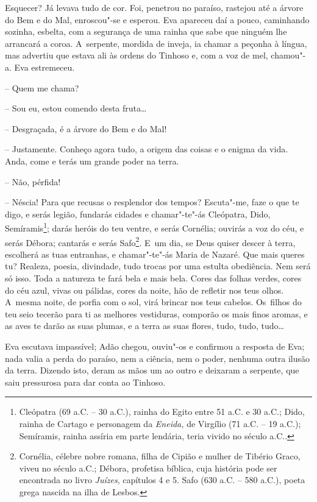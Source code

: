 Esquecer? Já levava tudo de cor. Foi, penetrou no paraíso, rastejou até
a árvore do Bem e do Mal, enroscou"-se e esperou. Eva apareceu daí a
pouco, caminhando sozinha, esbelta, com a segurança de uma rainha que
sabe que ninguém lhe arrancará a coroa. A~serpente, mordida de inveja,
ia chamar a peçonha à língua, mas advertiu que estava ali às ordens do
Tinhoso e, com a voz de mel, chamou"-a. Eva estremeceu.

-- Quem me chama?

-- Sou eu, estou comendo desta fruta\ldots{}

-- Desgraçada, é a árvore do Bem e do Mal!

-- Justamente. Conheço agora tudo, a origem das coisas e o enigma da
vida. Anda, come e terás um grande poder na terra.

-- Não, pérfida!

-- Néscia! Para que recusas o resplendor dos tempos? Escuta"-me, faze o
que te digo, e serás legião, fundarás cidades e chamar"-te"-ás Cleópatra,
Dido, Semíramis\footnote{Cleópatra (69 a.C. -- 30 a.C.), rainha do Egito
  entre 51 a.C. e 30 a.C.; Dido, rainha de Cartago e personagem da
  \emph{Eneida,} de Virgílio (71 a.C. -- 19 a.C.); Semíramis, rainha
  assíria em parte lendária, teria vivido no século  a.C..}; darás
heróis do teu ventre, e serás Cornélia; ouvirás a voz do céu, e serás
Débora; cantarás e serás Safo\footnote{Cornélia, célebre nobre romana,
  filha de Cipião e mulher de Tibério Graco, viveu no século  a.C.;
  Débora, profetisa bíblica, cuja história pode ser encontrada no livro
  \emph{Juízes}, capítulos 4 e 5. Safo (630 a.C. -- 580 a.C.), poeta
  grega nascida na ilha de Lesbos.}. E~um dia, se Deus quiser descer à
terra, escolherá as tuas entranhas, e chamar"-te"-ás Maria de Nazaré. Que
mais queres tu? Realeza, poesia, divindade, tudo trocas por uma estulta
obediência. Nem será só isso. Toda a natureza te fará bela e mais bela.
Cores das folhas verdes, cores do céu azul, vivas ou pálidas, cores da
noite, hão de refletir nos teus olhos. A~mesma noite, de porfia com o
sol, virá brincar nos teus cabelos. Os~filhos do teu seio tecerão para
ti as melhores vestiduras, comporão os mais finos aromas, e as aves te
darão as suas plumas, e a terra as suas flores, tudo, tudo, tudo\ldots{}

Eva escutava impassível; Adão chegou, ouviu"-os e confirmou a resposta de
Eva; nada valia a perda do paraíso, nem a ciência, nem o poder, nenhuma
outra ilusão da terra. Dizendo isto, deram as mãos um ao outro e
deixaram a serpente, que saiu pressurosa para dar conta ao Tinhoso.

